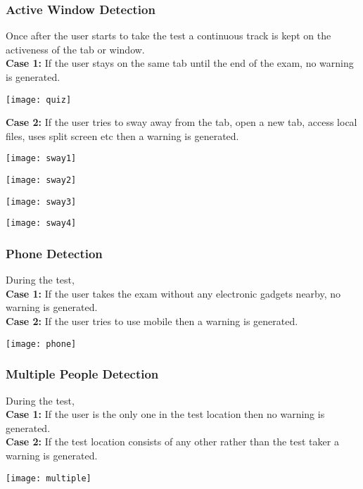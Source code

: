 \documentclass[12pt]{report}
\begin{document}
\subsubsection{Active Window Detection}
Once after the user starts to take the test a continuous track is kept on the activeness of the tab or window.\\
\textbf{Case 1:} If the user stays on the same tab until the end of the exam, no warning is generated.\\
\begin{center}
\texttt{[image: quiz]}
\end{center}
\textbf{Case 2:} If the user tries to sway away from the tab, open a new tab,  access local files, uses split screen etc then a warning is generated.
\begin{center}
\texttt{[image: sway1]}
\end{center}
\begin{center}
\texttt{[image: sway2]}
\end{center}
\begin{center}
\texttt{[image: sway3]}
\end{center}
\begin{center}
\texttt{[image: sway4]}
\end{center}
\subsubsection{Phone Detection}
During the test,\\
\textbf{Case 1:} If the user takes the exam without any electronic gadgets nearby, no warning is generated.\\
\textbf{Case 2:} If the user tries to use mobile then a warning is generated.
\begin{center}
\texttt{[image: phone]}
\end{center}
\subsubsection{Multiple People Detection}
During the test,\\
\textbf{Case 1:} If the user is the only one in the test location then no warning is generated.\\
\textbf{Case 2:} If the test location consists of any other rather than the test taker a warning is generated.
\begin{center}
\texttt{[image: multiple]}
\end{center}
\end{document}
